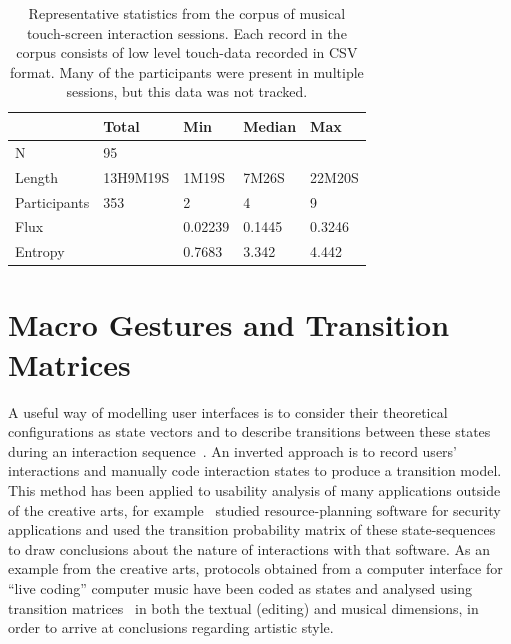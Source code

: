 \documentclass{sigchi}
\begin{document}
\begin{table}
\centering
\begin{tabular}{l|llll}
\hline
            & Total & Min  & Median   & Max     \\ 
\hline
N           & 95    &      &          &         \\
Length & 13H9M19S & 1M19S & 7M26S & 22M20S \\
Participants& 353   & 2    & 4        & 9        \\
Flux &   & 0.02239 & 0.1445 & 0.3246\\
Entropy &   & 0.7683 & 3.342 & 4.442\\          
\hline
\end{tabular}
\caption{
  Representative statistics from the corpus of musical touch-screen
  interaction sessions.  Each record in the corpus
  consists of low level touch-data recorded in CSV format. 
  Many of the participants were
  present in multiple sessions, but this data was not tracked.\label{corpus-table}}
\end{table}

\break 
\section{Macro Gestures and Transition Matrices}

A useful way of modelling user interfaces is to consider their
theoretical configurations as state vectors and to describe transitions between these states during
an interaction sequence~\cite{Thimbleby:2001kq, Thimbleby:2004fj}. An
inverted approach is to record users' interactions and manually code
interaction states to produce a transition model. This method has been
applied to usability analysis of many applications outside of the creative arts, for example~\cite{Kannampallil:2007fp}
studied resource-planning software for
security applications and used the transition
probability matrix of these state-sequences to draw
conclusions about the nature of interactions with that software. As an example from the creative
arts, protocols obtained from a computer interface for ``live coding''
computer music have been  coded as states and analysed using
transition matrices~\cite{Swift:2014tya} in both the textual (editing) and
musical dimensions, in order to arrive at conclusions regarding
artistic style.
\end{document}
